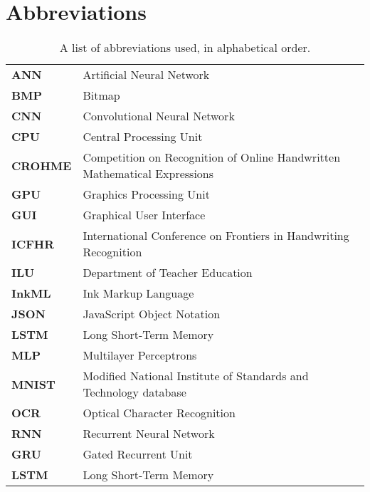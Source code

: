 \section{Abbreviations}  %
\begin{table}[H]
\begin{tabular}{ l l }
\textbf{ANN} & Artificial Neural Network \\
\textbf{BMP} & Bitmap \\
\textbf{CNN} & Convolutional Neural Network \\
\textbf{CPU} & Central Processing Unit \\
\textbf{CROHME} & Competition on Recognition of Online Handwritten Mathematical Expressions\\
\textbf{GPU} & Graphics Processing Unit \\
\textbf{GUI} & Graphical User Interface \\
\textbf{ICFHR} & International Conference on Frontiers in Handwriting Recognition \\
\textbf{ILU} & Department of Teacher Education \\
\textbf{InkML} & Ink Markup Language \\
\textbf{JSON} & JavaScript Object Notation \\
\textbf{LSTM} & Long Short-Term Memory \\
\textbf{MLP} & Multilayer Perceptrons \\
\textbf{MNIST} & Modified National Institute of Standards and Technology database \\
\textbf{OCR} & Optical Character Recognition \\
\textbf{RNN} & Recurrent Neural Network \\
\textbf{GRU} & Gated Recurrent Unit \\
\textbf{LSTM} & Long Short-Term Memory \\

\end{tabular}
\label{table:abbreviations}
\caption{A list of abbreviations used, in alphabetical order.}
\end{table}